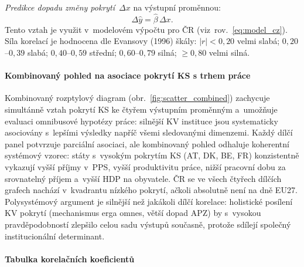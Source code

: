 \emph{Predikce dopadu změny pokrytí}~$\Delta x$ na výstupní proměnnou:
\begin{equation}\label{eq:delta_pred}
  \Delta\hat{y} = \hat{\beta}\,\Delta x.
\end{equation}
Tento vztah je využit v~modelovém výpočtu pro ČR (viz~rov.~\eqref{eq:model_cz}).
Síla korelací je hodnocena dle Evansovy (1996) škály: $|r| < 0{,}20$ velmi slabá;
$0{,}20$--$0{,}39$ slabá; $0{,}40$--$0{,}59$ střední; $0{,}60$--$0{,}79$ silná;
$\geq 0{,}80$ velmi silná.

\paragraph{Kombinovaný pohled na asociace pokrytí KS s trhem práce}\label{par:scatter_combined}

Kombinovaný rozptylový diagram (obr.~\ref{fig:scatter_combined}) zachycuje simultánně vztah pokrytí \ac{KS} ke čtyřem výstupním proměnným a~umožňuje evaluaci omnibusové hypotézy práce: silnější \ac{KV} instituce jsou systematicky asociovány s~lepšími výsledky napříč všemi sledovanými dimenzemi.
Každý dílčí panel potvrzuje parciální asociaci, ale kombinovaný pohled odhaluje koherentní systémový vzorec: státy s~vysokým pokrytím \ac{KS} (AT, DK, BE, FR) konzistentně vykazují vyšší příjmy v~PPS, vyšší produktivitu práce, nižší pracovní dobu za srovnatelný příjem a~vyšší HDP na obyvatele.
ČR se ve všech čtyřech dílčích grafech nachází v~kvadrantu nízkého pokrytí, ačkoli absolutně není na dně EU27.
Polysystémový argument je silnější než jakákoli dílčí korelace: holistické posílení \ac{KV} pokrytí (mechanismus erga omnes, větší dopad \ac{APZ}) by s~vysokou pravděpodobností zlepšilo celou sadu výstupů současně, protože sdílejí společný institucionální determinant.



\paragraph{Tabulka korelačních koeficientů}\label{par:corr_table}

